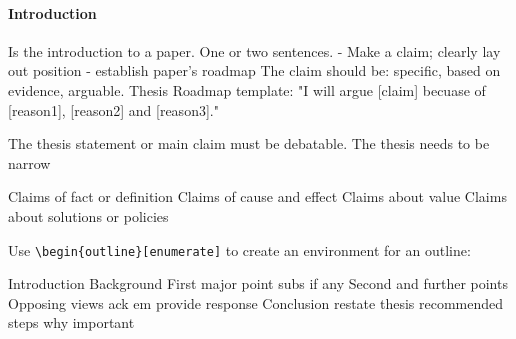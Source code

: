 \newcommand{\assignmentTitle}{ASSIGNMENT T*I*T*L*E*}




\paragraph{Introduction}
  Is the introduction to a paper. One or two sentences.
  - Make a claim; clearly lay out position
  - establish paper's roadmap
  The claim should be: specific, based on evidence, arguable.
  Thesis Roadmap template: "I will argue [claim] becuase of [reason1], [reason2] and [reason3]."

  The thesis statement or main claim must be debatable.
  The thesis needs to be narrow

  Claims of fact or definition
  Claims of cause and effect
  Claims about value
  Claims about solutions or policies

  Use \verb|\begin{outline}[enumerate]| to create an environment for an outline:

\begin{outline}[enumerate]
  \1 Introduction
  \1 Background
  \1 First major point
    \2 subs if any
  \1 Second and further points
  \1 Opposing views
    \2 ack em
    \2 provide response
  \1 Conclusion
    \2 restate thesis
    \2 recommended steps
    \2 why important
\end{outline}



